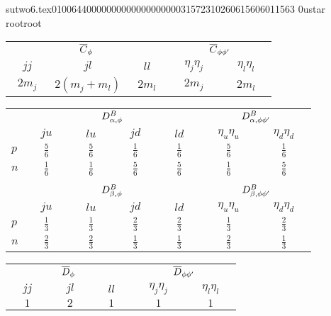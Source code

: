                                                                                                                                                                                                                                                                                       sutwo6.tex                                                                                          0100644 0000000 0000000 00000315723 10260615606 011563  0                                                                                                    ustar   root                            root                                                                                                                                                                                                                   \documentclass[prd,amssymb,amsmath,showpacs,nofootinbib,superscriptaddress]{revtex4}
\begin{document}
\begin{table}[ht]
\bigskip

\begin{tabular}{ c c c | c c}
    \multicolumn{3}{c|}{${\overline{C}}_\phi$}
  & \multicolumn{2}{c}{${\overline{C}}_{\phi\phi'}$}\\
    $\quad jj \quad$ 
  & $\quad jl \quad$ 
  & $\quad ll \quad$
  & $\quad \eta_j \eta_j \quad$ 
  & $\quad \eta_l \eta_l \quad$ \\
\hline
    $2 m_j$
  & $2 (m_j +m_l)$
  & $2 m_l$
  & $2 m_j$ 
  & $2 m_l$\\
\end{tabular}

\bigskip

\begin{tabular}{l | c c c c | c c}
& \multicolumn{4}{c|}{$D^B_{{\alpha},\phi}$} 
& \multicolumn{2}{c}{$D^B_{{\alpha},\phi\phi'}$} \\
  & $\quad ju \quad$ 
  & $\quad lu \quad $ 
  & $\quad jd \quad $  
  & $\quad ld \quad$ 
  & $\quad \eta_u \eta_u \quad$ 
  & $\quad \eta_d \eta_d \quad$ \\
\hline
$p$       
  & $\frac{5}{6}$ 
  & $\frac{5}{6}$  
  & $\frac{1}{6}$ 
  & $\frac{1}{6}$ 
  & $\frac{5}{6}$ 
  & $\frac{1}{6}$ \\

$n$ 
  & $\frac{1}{6}$ 
  & $\frac{1}{6}$  
  & $\frac{5}{6}$ 
  & $\frac{5}{6}$
  & $\frac{1}{6}$ 
  & $\frac{5}{6}$ \\

\multicolumn{6}{c}{}
\\
& \multicolumn{4}{c|}{$D^B_{{\beta},\phi} $} 
& \multicolumn{2}{c}{$D^B_{{\beta},\phi\phi'}$} \\
  & $\quad ju \quad$ 
  & $\quad lu \quad $ 
  & $\quad jd \quad $  
  & $\quad ld \quad$ 
  & $\quad \eta_u \eta_u \quad$ 
  & $\quad \eta_d \eta_d \quad$ \\
\hline
$p$       
  & $\frac{1}{3}$ 
  & $\frac{1}{3}$  
  & $\frac{2}{3}$ 
  & $\frac{2}{3}$ 
  & $\frac{1}{3}$ 
  & $\frac{2}{3}$ \\

$n$ 
  & $\frac{2}{3}$ 
  & $\frac{2}{3}$  
  & $\frac{1}{3}$ 
  & $\frac{1}{3}$
  & $\frac{2}{3}$ 
  & $\frac{1}{3}$ \\
\end{tabular}

\bigskip

\begin{tabular}{c c c | c c}
    \multicolumn{3}{c|}{${\overline{D}}_\phi$}
  & \multicolumn{2}{c}{${\overline{D}}_{\phi\phi'}$}\\
    $\quad jj \quad$ 
  & $\quad jl \quad$ 
  & $\quad ll \quad$ 
  & $\quad \eta_j \eta_j \quad$ 
  & $\quad \eta_l \eta_l \quad$ \\  
\hline 
    $1$ 
  & $2$ 
  & $1$ 
  & $1$ 
  & $1$
\end{tabular}
\label{t:NPQQCD-C}
\end{table}
\end{document}
